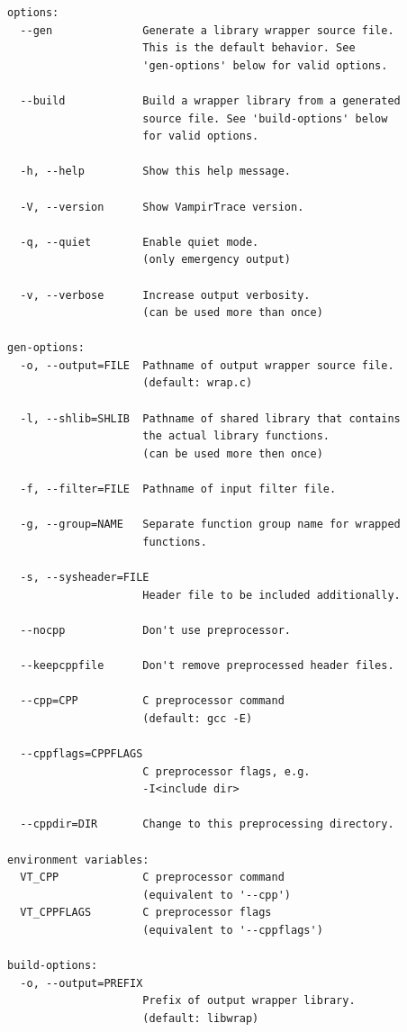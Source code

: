\documentclass[a4paper,twoside,12pt,BCOR12mm]{scrbook}
\begin{document}
\begin{latexonly}
\begin{verbatim}
options:
  --gen              Generate a library wrapper source file. 
                     This is the default behavior. See 
                     'gen-options' below for valid options.

  --build            Build a wrapper library from a generated 
                     source file. See 'build-options' below 
                     for valid options.

  -h, --help         Show this help message.

  -V, --version      Show VampirTrace version.

  -q, --quiet        Enable quiet mode. 
                     (only emergency output)

  -v, --verbose      Increase output verbosity.
                     (can be used more than once)

gen-options:
  -o, --output=FILE  Pathname of output wrapper source file.
                     (default: wrap.c)                      

  -l, --shlib=SHLIB  Pathname of shared library that contains 
                     the actual library functions.
                     (can be used more then once)

  -f, --filter=FILE  Pathname of input filter file.

  -g, --group=NAME   Separate function group name for wrapped 
                     functions.

  -s, --sysheader=FILE
                     Header file to be included additionally.

  --nocpp            Don't use preprocessor.

  --keepcppfile      Don't remove preprocessed header files.

  --cpp=CPP          C preprocessor command
                     (default: gcc -E)     

  --cppflags=CPPFLAGS 
                     C preprocessor flags, e.g. 
                     -I<include dir>

  --cppdir=DIR       Change to this preprocessing directory.

environment variables:
  VT_CPP             C preprocessor command 
                     (equivalent to '--cpp')
  VT_CPPFLAGS        C preprocessor flags 
                     (equivalent to '--cppflags')

build-options:
  -o, --output=PREFIX
                     Prefix of output wrapper library.
                     (default: libwrap)               


\end{verbatim}
\end{latexonly}
\end{document}
